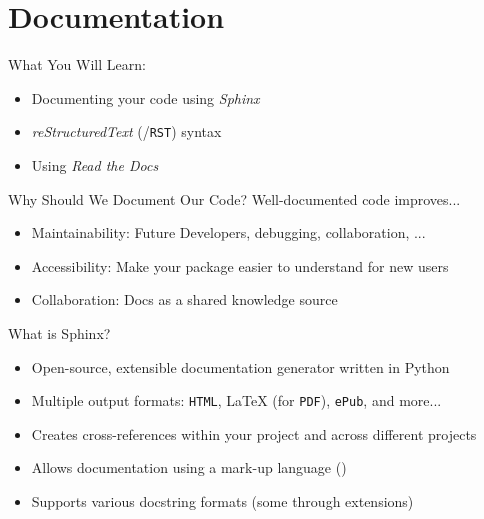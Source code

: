\section{Documentation}


\begin{frame}[fragile]{What You Will Learn:}
  \begin{itemize}
    \item Documenting your code using \emph{Sphinx}
    \item \emph{reStructuredText} (\reST/\texttt{RST}) syntax
    \item Using \emph{Read the Docs}
  \end{itemize}
\end{frame}


\begin{frame}[fragile]{Why Should We Document Our Code?}
  Well-documented code improves...
  \begin{itemize}
    \item Maintainability: Future Developers, debugging, collaboration, ...
    \item Accessibility: Make your package easier to understand for new users
    \item Collaboration: Docs as a shared knowledge source
  \end{itemize}
\end{frame}


\begin{frame}[fragile]{
  What is Sphinx?
  \hfill
  }
  \begin{itemize}
    \item Open-source, extensible documentation generator written in Python
    \item Multiple output formats: \texttt{HTML}, \LaTeX{} (for \texttt{PDF}), \texttt{ePub}, and more...
    \item Creates cross-references within your project and across different projects
    \item Allows documentation using a mark-up language (\reST)
    \item Supports various docstring formats (some through extensions)
  \end{itemize}
\end{frame}


